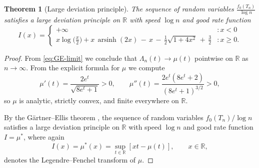 \documentclass[11pt,a4paper]{article}
\numberwithin{equation}{section}
\newtheorem {theorem}{Theorem}[section]
\def\RR{\mathbb{R}}
\begin{document}
\begin{theorem}[Large deviation principle]\label{thm:LDP}
The sequence of random variables $\tfrac{f_0(T_n)}{\log n}$ satisfies a large deviation principle on $\RR$ with speed $\log n$ and good rate function
\begin{equation}\label{eq:rate-explicit}
I(x)=\begin{cases}
    + \infty &: x<0\\
    x\log\!\Big(\frac{x}{2}\Big)+x\,\operatorname{arsinh}(2x)\,-\,x\,-\,\frac12\sqrt{1+4x^2}\,+\,\frac32 &: x\geq 0.
\end{cases}
\end{equation}
\end{theorem}
\begin{proof}
From \eqref{eq:GE-limit} we conclude that $\Lambda_n(t)\to\mu(t)$ pointwise on $\RR$ as $n\to\infty$. From the explicit formula for $\mu$ we compute
\begin{equation*}
\mu'(t)=\frac{2e^t}{\sqrt{8e^t+1}}>0,\qquad
\mu''(t)=\frac{2e^t(8e^t+2)}{(8e^t+1)^{3/2}}>0,
\end{equation*}
so $\mu$ is analytic, strictly convex, and finite everywhere on $\RR$.

By the Gärtner--Ellis theorem \cite[Theorem 2.3.6]{DZlargeDeviations}, the sequence of random variables $f_0(T_n)/\log n$ satisfies a large deviation principle on $\RR$ with speed $\log n$ and good rate function $I=\mu^{*}$, where again
\begin{equation}\label{eqn:LF-Irate}
I(x)=\mu^{*}(x) = \sup_{t\in\RR}[xt-\mu(t)],\qquad x\in\RR,
\end{equation}
denotes the Legendre--Fenchel transform of $\mu$.


\end{proof}
\end{document}
